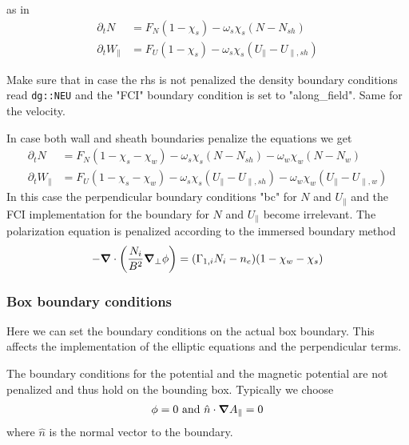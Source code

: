 as in
\begin{subequations} \label{eq:sheath_equations}
\begin{align}
    \partial_t N &= F_N ( 1-\chi_s)  -\omega_s\chi_s (N-N_{sh})\\
    \partial_t W_\parallel &= F_U  ( 1 - \chi_s) -\omega_s\chi_s (U_\parallel-
        U_{\parallel,sh})
\end{align}
\end{subequations}
\begin{tcolorbox}[title=Note]
    Make sure that in case the rhs is not penalized the density boundary conditions
    read \texttt{dg::NEU} and the "FCI" boundary condition is set to "along\_field".
    Same for the velocity.
\end{tcolorbox}

\begin{tcolorbox}[title=Note]
    In case both wall and sheath boundaries penalize the equations we get
    \begin{subequations} \label{eq:sheath_wall_equations}
    \begin{align}
        \partial_t N &= F_N ( 1-\chi_s - \chi_w)  -\omega_s\chi_s (N-N_{sh}) -\omega_w\chi_w (N-N_{w})\\
        \partial_t W_\parallel &= F_U  ( 1 - \chi_s- \chi_w) -\omega_s \chi_s (U_\parallel - U_{\parallel,sh})-\omega_w\chi_w (U_\parallel- U_{\parallel,w})
    \end{align}
    \end{subequations}
    In this case the perpendicular boundary
    conditions "bc" for $N$ and $U_\parallel$ and the FCI implementation for the
    boundary for $N$ and $U_\parallel$ become irrelevant.
The polarization equation is penalized according to the immersed boundary method
\begin{align}
    -{\boldsymbol{\nabla}}\cdot\left( \frac{N_i}{B^2}{\boldsymbol{\nabla}}_{\perp} \phi \right) = (\Gamma_{1,i} N_i - n_e)(1-\chi_w -\chi_s)
\end{align}
\end{tcolorbox}

\subsubsection{Box boundary conditions}
Here we can set the boundary conditions on the actual box boundary.
This affects the implementation of the elliptic equations and the
perpendicular terms.

The boundary conditions for the potential and the magnetic potential are not
penalized and thus hold on the bounding box. Typically we choose
\begin{align}
\phi = 0
\text{ and }  \hat n \cdot{\boldsymbol{\nabla}} A_{\parallel} = 0
\end{align}
where $\hat n$ is the normal vector to the boundary.

